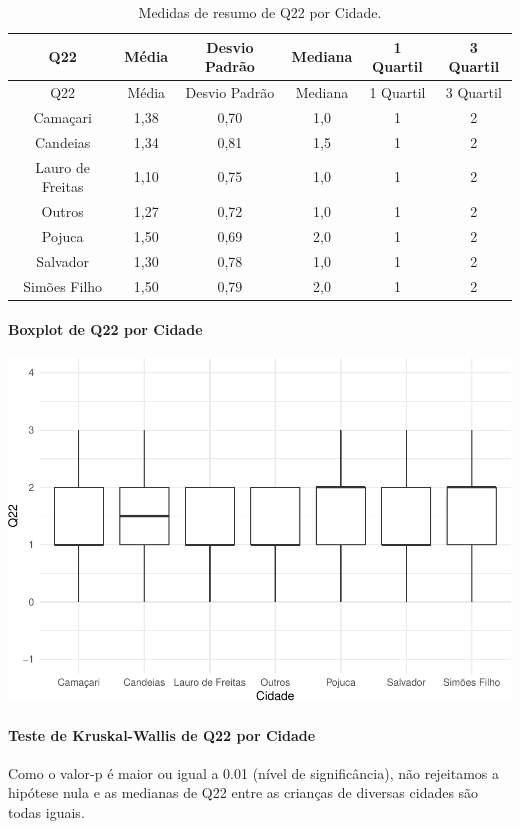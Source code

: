 \documentclass[]{article}
\let\oldparagraph\paragraph
\renewcommand{\paragraph}[1]{\oldparagraph{#1}\mbox{}}
\begin{document}
\begin{longtable}[]{@{}cccccc@{}}
\caption{\label{tab:unnamed-chunk-489}Medidas de resumo de Q22 por Cidade.}\tabularnewline
\toprule
Q22 & Média & Desvio Padrão & Mediana & 1 Quartil & 3 Quartil\tabularnewline
\midrule
\endfirsthead
\toprule
Q22 & Média & Desvio Padrão & Mediana & 1 Quartil & 3 Quartil\tabularnewline
\midrule
\endhead
Camaçari & 1,38 & 0,70 & 1,0 & 1 & 2\tabularnewline
Candeias & 1,34 & 0,81 & 1,5 & 1 & 2\tabularnewline
Lauro de Freitas & 1,10 & 0,75 & 1,0 & 1 & 2\tabularnewline
Outros & 1,27 & 0,72 & 1,0 & 1 & 2\tabularnewline
Pojuca & 1,50 & 0,69 & 2,0 & 1 & 2\tabularnewline
Salvador & 1,30 & 0,78 & 1,0 & 1 & 2\tabularnewline
Simões Filho & 1,50 & 0,79 & 2,0 & 1 & 2\tabularnewline
\bottomrule
\end{longtable}

\hypertarget{boxplot-de-q22-por-cidade}{%
\paragraph{Boxplot de Q22 por Cidade}\label{boxplot-de-q22-por-cidade}}

\begin{center}\includegraphics[width=0.75\linewidth]{relatorio_covid19_files/figure-latex/unnamed-chunk-490-1} \end{center}

\hypertarget{teste-de-kruskal-wallis-de-q22-por-cidade}{%
\paragraph{Teste de Kruskal-Wallis de Q22 por Cidade}\label{teste-de-kruskal-wallis-de-q22-por-cidade}}

Como o valor-p é maior ou igual a 0.01 (nível de significância), não rejeitamos a hipótese nula e as medianas de Q22 entre as crianças de diversas cidades são todas iguais.
\end{document}
